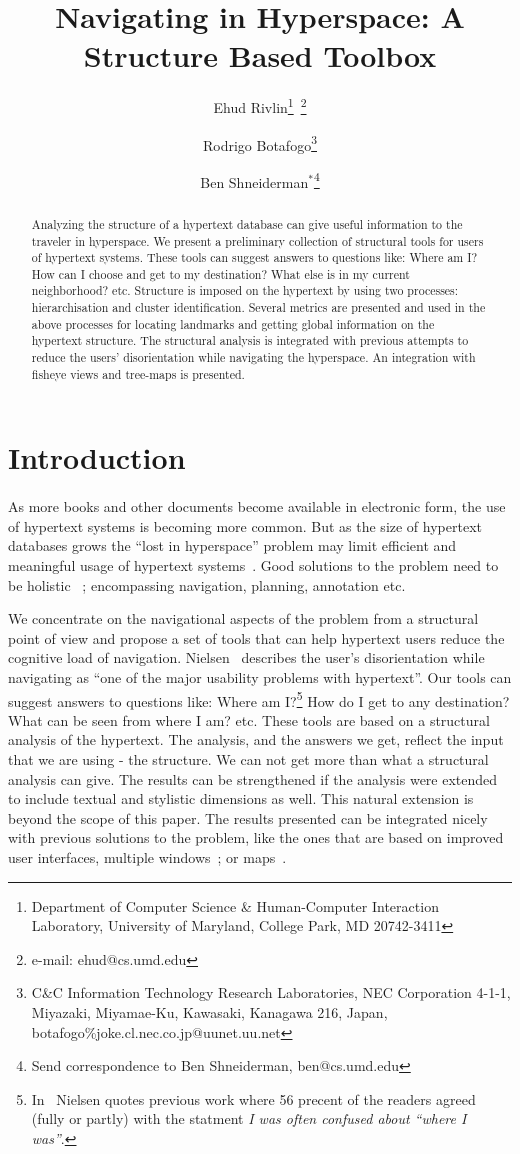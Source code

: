 \documentclass[twocolumn,10pt]{article}
\title{Navigating in Hyperspace: A Structure Based Toolbox}
\author{Ehud Rivlin\thanks{Department of Computer Science \&
Human-Computer Interaction Laboratory,
University of Maryland,
College Park, MD 20742-3411}\ \thanks{e-mail: ehud@cs.umd.edu}
\and 
Rodrigo Botafogo\thanks{C\&C Information Technology Research
Laboratories, NEC Corporation 4-1-1, Miyazaki, Miyamae-Ku, Kawasaki,
Kanagawa 216, Japan, botafogo\%joke.cl.nec.co.jp@uunet.uu.net} 
\and 
Ben Shneiderman$^*$\thanks{Send correspondence to Ben Shneiderman,
ben@cs.umd.edu}}
\date{}
\begin{document}
\maketitle


\begin{abstract}

Analyzing the structure of a hypertext database can give useful
information to the traveler in hyperspace. We present a preliminary
collection of structural tools for users of hypertext systems. These
tools can suggest answers to questions like: Where am I? How can I
choose and get to my destination? What else is in my current
neighborhood? etc.  Structure is imposed on the hypertext by using two
processes: hierarchisation and cluster identification.  Several
metrics are presented and used in the above processes for locating
landmarks and getting global information on the hypertext structure.
The structural analysis is integrated with previous attempts to reduce
the users' disorientation while navigating the hyperspace. An
integration with fisheye views and tree-maps is presented.

\end{abstract}

\section{Introduction}
\paragraph{}

As more books and other documents become available in electronic form,
the use of hypertext 
systems is becoming more common. But as the size of hypertext databases
grows the ``lost in hyperspace'' problem may limit
efficient and meaningful usage of hypertext systems~\cite{nie90}.
Good solutions to the problem need to be holistic ~\cite{nor}; encompassing
navigation, planning, annotation etc.

We concentrate on the navigational aspects of the problem from a
structural point of view and propose a set of tools that can help
hypertext users reduce the cognitive load of navigation. 
Nielsen~\cite{nie90} describes the user's disorientation while
navigating as ``one of the major usability problems with hypertext''.
Our tools can suggest answers to questions like: Where am
I?\footnote{In~\cite{nie90} Nielsen quotes previous work where 56
precent of the readers agreed (fully or partly) with the statment {\em
I was often confused about ``where I was''}.} How do I get to any
destination? What can be seen from where I am? etc. These tools are
based on a structural analysis of the hypertext. The analysis, and the
answers we get, reflect the input that we are using - the structure.
We can not get more than what a structural analysis can give. The
results can be strengthened if the analysis were extended to include
textual and stylistic dimensions as well. This natural extension is
beyond the scope of this paper. The results presented can be
integrated nicely with previous solutions to the problem, like the
ones that are based on improved user interfaces, multiple
windows~\cite{mar89}; or maps~\cite{nie90}.
\end{document}
